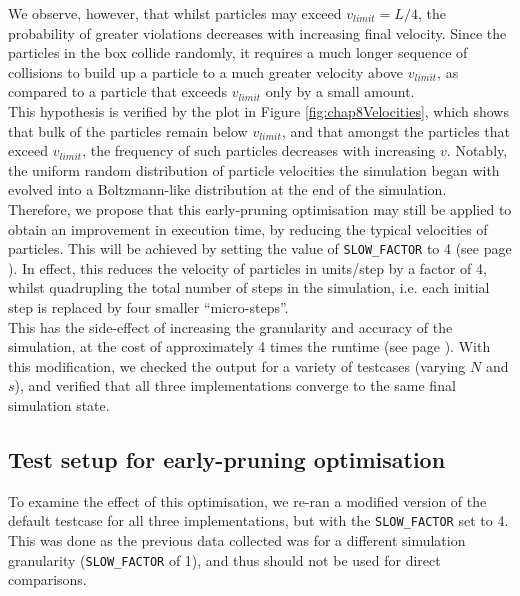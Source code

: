 \documentclass[12pt]{article}
\begin{document}
We observe, however, that whilst particles may exceed $v_{limit} = L/4$, the probability of greater violations decreases with increasing final velocity. Since the particles in the box collide randomly, it requires a much longer sequence of collisions to build up a particle to a much greater velocity above $v_{limit}$, as compared to a particle that exceeds $v_{limit}$ only by a small amount. \\

This hypothesis is verified by the plot in Figure \ref{fig:chap8Velocities}, which shows that bulk of the particles remain below $v_{limit}$, and that amongst the particles that exceed $v_{limit}$, the frequency of such particles decreases with increasing $v$. Notably, the uniform random distribution of particle velocities the simulation began with evolved into a Boltzmann-like distribution at the end of the simulation. \\

Therefore, we propose that this early-pruning optimisation may still be applied to obtain an improvement in execution time, by reducing the typical velocities of particles. This will be achieved by setting the value of \texttt{SLOW\_FACTOR} to 4 (see page \pageref{slow-factor-ref}). In effect, this reduces the velocity of particles in units/step by a factor of 4, whilst quadrupling the total number of steps in the simulation, i.e. each initial step is replaced by four smaller ``micro-steps''. \\

This has the side-effect of increasing the granularity and accuracy of the simulation, at the cost of approximately 4 times the runtime (see page \pageref{seq-linear-growth-steps}). With this modification, we checked the output for a variety of testcases (varying $N$ and $s$), and verified that all three implementations converge to the same final simulation state.

\subsection{Test setup for early-pruning optimisation}

To examine the effect of this optimisation, we re-ran a modified version of the default testcase for all three implementations, but with the \texttt{SLOW\_FACTOR} set to 4. This was done as the previous data collected was for a different simulation granularity (\texttt{SLOW\_FACTOR} of 1), and thus should not be used for direct comparisons. \\
\end{document}
